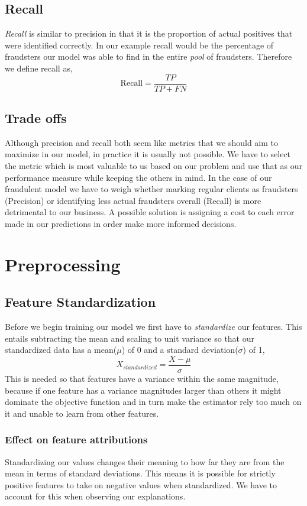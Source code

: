 \subsection{Recall}
\emph{Recall} is similar to precision in that it is the proportion of actual positives that were identified correctly. In our example recall would be the percentage of fraudsters our model was able to find in the entire \emph{pool} of fraudsters. Therefore we define recall as,
\begin{equation}
    \mbox{Recall} = \frac{TP}{TP + FN}
\end{equation}
\subsection{Trade offs}
Although precision and recall both seem like metrics that we should aim to maximize in our model, in practice it is usually not possible. We have to select the metric which is most valuable to us based on our problem and use that as our performance measure while keeping the others in mind. In the case of our fraudulent model we have to weigh whether marking regular clients as fraudsters (Precision) or identifying less actual fraudsters overall (Recall) is more detrimental to our business. A possible solution is assigning a cost to each error made in our predictions in order make more informed decisions.
\section{Preprocessing}
\subsection{Feature Standardization}

Before we begin training our model we first have to \emph{standardize} our features. This entails subtracting the mean and scaling to unit variance so that our standardized data has a mean($\mu$) of 0 and a standard deviation($\sigma$) of 1,
\begin{equation}
    X_{standardized} = \frac{X-\mu}{\sigma}
\end{equation}
This is needed so that features have a variance within the same magnitude, because if one feature has a variance magnitudes larger than others it might dominate the objective function and in turn make the estimator rely too much on it and unable to learn from other features. 
\subsubsection{Effect on feature attributions} Standardizing our values changes their meaning to how far they are from the mean in terms of standard deviations. This means it is possible for strictly positive features to take on negative values when standardized. We have to account for this when observing our explanations.
